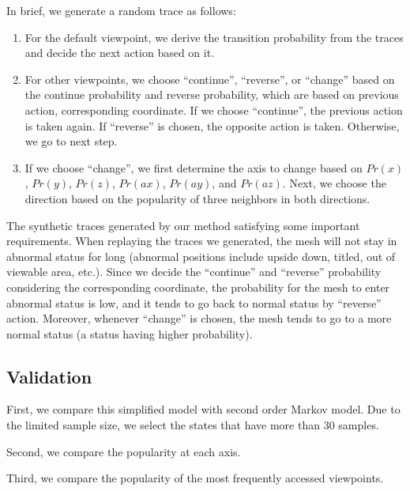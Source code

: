 In brief, we generate a random trace as follows:
\begin{enumerate}
    \item For the default viewpoint, we derive the transition probability from the traces and decide the
        next action based on it.
    \item For other viewpoints, we choose ``continue'', ``reverse'', or ``change'' 
        based on the continue probability and reverse probability,
        which are based on {previous action, corresponding coordinate}.
        If we choose ``continue'', the previous action is taken again.
        If ``reverse'' is chosen, the opposite action is taken.
        Otherwise, we go to next step.
    \item If we choose ``change'', 
        we first determine the axis to change based on $Pr(x)$, $Pr(y)$, $Pr(z)$, 
        $Pr(ax)$, $Pr(ay)$, and $Pr(az)$. 
        Next, we choose the direction based on the popularity of three
        neighbors in both directions.
\end{enumerate}

The synthetic traces generated by our method satisfying some important requirements. 
When replaying the traces we generated, the mesh will not stay in abnormal status for long 
(abnormal positions include upside down, titled, out of viewable area, etc.).
Since we decide the ``continue'' and ``reverse'' probability considering the corresponding coordinate,
the probability for the mesh to enter abnormal status is low, and it tends to go back to normal status
by ``reverse'' action. 
Moreover, whenever ``change'' is chosen, 
the mesh tends to go to a more normal status (a status having higher probability). 

\subsection{Validation}
First, we compare this simplified model with second order Markov model. Due to the limited sample size, we 
select the states that have more than 30 samples. 

Second, we compare the popularity at each axis. 

Third, we compare the popularity of the most frequently accessed viewpoints.
